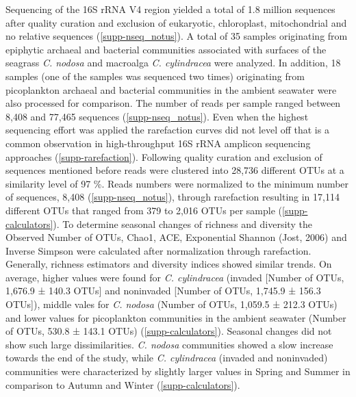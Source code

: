 \documentclass[12pt,]{article}
\begin{document}
Sequencing of the 16S rRNA V4 region yielded a total of 1.8 million
sequences after quality curation and exclusion of eukaryotic,
chloroplast, mitochondrial and no relative sequences
(\autoref{supp-nseq_notus}). A total of 35 samples originating from
epiphytic archaeal and bacterial communities associated with surfaces of
the seagrass \emph{C. nodosa} and macroalga \emph{C. cylindracea} were
analyzed. In addition, 18 samples (one of the samples was sequenced two
times) originating from picoplankton archaeal and bacterial communities
in the ambient seawater were also processed for comparison. The number
of reads per sample ranged between 8,408 and 77,465 sequences
(\autoref{supp-nseq_notus}). Even when the highest sequencing effort was
applied the rarefaction curves did not level off that is a common
observation in high-throughput 16S rRNA amplicon sequencing approaches
(\autoref{supp-rarefaction}). Following quality curation and exclusion
of sequences mentioned before reads were clustered into 28,736 different
OTUs at a similarity level of 97 \si{\percent}. Reads numbers were
normalized to the minimum number of sequences, 8,408
(\autoref{supp-nseq_notus}), through rarefaction resulting in 17,114
different OTUs that ranged from 379 to 2,016 OTUs per sample
(\autoref{supp-calculators}). To determine seasonal changes of richness
and diversity the Observed Number of OTUs, Chao1, ACE, Exponential
Shannon (Jost, 2006) and Inverse Simpson were calculated after
normalization through rarefaction. Generally, richness estimators and
diversity indices showed similar trends. On average, higher values were
found for \emph{C. cylindracea} (invaded {[}Number of OTUs, 1,676.9 ±
140.3 OTUs{]} and noninvaded {[}Number of OTUs, 1,745.9 ± 156.3
OTUs{]}), middle vales for \emph{C. nodosa} (Number of OTUs, 1,059.5 ±
212.3 OTUs) and lower values for picoplankton communities in the ambient
seawater (Number of OTUs, 530.8 ± 143.1 OTUs)
(\autoref{supp-calculators}). Seasonal changes did not show such large
dissimilarities. \emph{C. nodosa} communities showed a slow increase
towards the end of the study, while \emph{C. cylindracea} (invaded and
noninvaded) communities were characterized by slightly larger values in
Spring and Summer in comparison to Autumn and Winter
(\autoref{supp-calculators}).
\end{document}
